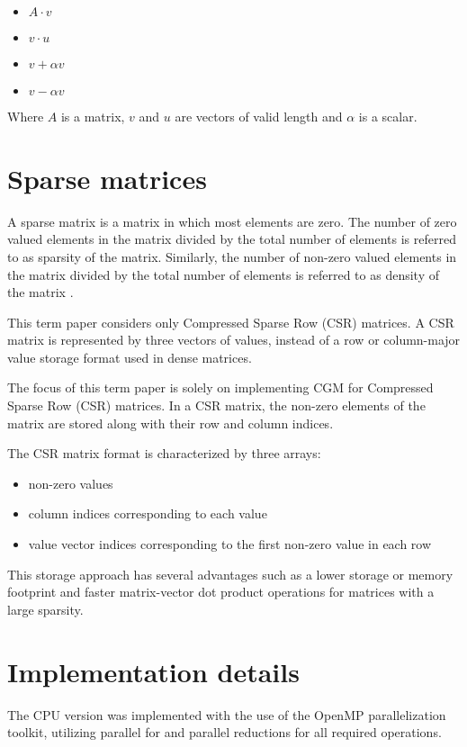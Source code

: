 \documentclass{article}
\begin{document}
\begin{itemize}
  \item $A \cdot v$
  \item $v \cdot u$
  \item $v + \alpha v$
  \item $v - \alpha v$
\end{itemize}

Where $A$ is a matrix, $v$ and $u$ are vectors of valid length and $\alpha$ is a scalar.

\section{Sparse matrices}
A sparse matrix is a matrix in which most elements are zero.
The number of zero valued elements in the matrix divided by the total number of elements
is referred to as sparsity of the matrix.
Similarly, the number of non-zero valued elements in the matrix divided by the total number
of elements is referred to as density of the matrix \cite{wiki_csr}.

This term paper considers only Compressed Sparse Row (CSR) matrices.
A CSR matrix is represented by three vectors of values, instead of
a row or column-major value storage format used in dense matrices.

The focus of this term paper is solely on implementing CGM for Compressed Sparse Row (CSR) matrices.
In a CSR matrix, the non-zero elements of the matrix are stored along with their row and column indices.

The CSR matrix format is characterized by three arrays:
\begin{itemize}
  \item non-zero values
  \item column indices corresponding to each value
  \item value vector indices corresponding to the first non-zero value in each row
\end{itemize}

This storage approach has several advantages such as a lower storage or memory footprint
and faster matrix-vector dot product operations for matrices with a large sparsity.

\section{Implementation details}
The CPU version was implemented with the use of the OpenMP parallelization toolkit,
utilizing parallel for and parallel reductions for all required operations.
\end{document}
